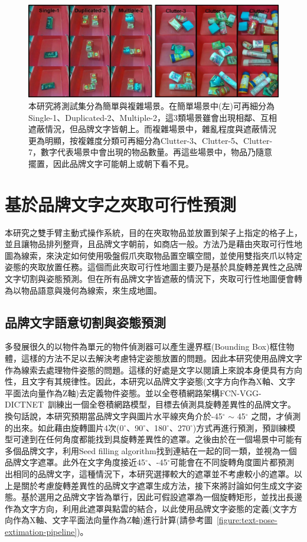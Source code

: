 \begin{figure}[htb]
	\centering
	\includegraphics[height=!, width=0.9\linewidth, keepaspectratio=true]
	{./figures/testset.jpg}
  \caption{本研究將測試集分為簡單與複雜場景。在簡單場景中(左)可再細分為Single-1、Duplicated-2、Multiple-2，這3類場景雖會出現相鄰、互相遮蔽情況，但品牌文字皆朝上。而複雜場景中，雜亂程度與遮蔽情況更為明顯，按複雜度分類可再細分為Clutter-3、Clutter-5、Clutter-7，數字代表場景中會出現的物品數量。再這些場景中，物品乃隨意擺置，因此品牌文字可能朝上或朝下看不見。}
  \label{figure:testset}
\end{figure}


\section{基於品牌文字之夾取可行性預測}
本研究之雙手臂主動式操作系統，目的在夾取物品並放置到架子上指定的格子上，並且讓物品排列整齊，且品牌文字朝前，如商店一般。方法乃是藉由夾取可行性地圖為線索，來決定如何使用吸盤假爪夾取物品置空曠空間，並使用雙指夾爪以特定姿態的夾取放置任務。這個而此夾取可行性地圖主要乃是基於具旋轉差異性之品牌文字切割與姿態預測。但在所有品牌文字皆遮蔽的情況下，夾取可行性地圖便會轉為以物品語意與幾何為線索，來生成地圖。

\subsection{品牌文字語意切割與姿態預測}
多發展很久的以物件為單元的物件偵測器可以產生邊界框(Bounding Box)框住物體，這樣的方法不足以去解決考慮特定姿態放置的問題。因此本研究使用品牌文字作為線索去處理物件姿態的問題。這樣的好處是文字以閱讀上來說本身便具有方向性，且文字有其規律性。因此，本研究以品牌文字姿態(文字方向作為X軸、文字平面法向量作為Z軸)去定義物件姿態。並以全卷積網路架構FCN-VGG-DICTNET~\cite{peterthesis}訓練出一個全卷積網路模型，目標去偵測具旋轉差異性的品牌文字。換句話說，本研究預期當品牌文字與圖片水平線夾角介於-45$^{\circ}$ $\sim$ 45$^{\circ}$ 之間，才偵測的出來。如此藉由旋轉圖片4次(0$^{\circ}$、90$^{\circ}$、180$^{\circ}$、270$^{\circ}$)方式再進行預測，預訓練模型可達到在任何角度都能找到具旋轉差異性的遮罩。之後由於在一個場景中可能有多個品牌文字，利用Seed filling algorithm找到連結在一起的同一類，並視為一個品牌文字遮罩。此外在文字角度接近45$^{\circ}$、-45$^{\circ}$可能會在不同旋轉角度圖片都預測出相同的品牌文字，這種情況下，本研究選擇較大的遮罩並不考慮較小的遮罩。以上是關於考慮旋轉差異性的品牌文字遮罩生成方法，接下來將討論如何生成文字姿態。基於選用之品牌文字皆為單行，因此可假設遮罩為一個旋轉矩形，並找出長邊作為文字方向，利用此遮罩與點雲的結合，以此使用品牌文字姿態的定義(文字方向作為X軸、文字平面法向量作為Z軸)進行計算(請參考圖~\ref{figure:text-pose-extimation-pipeline})。

